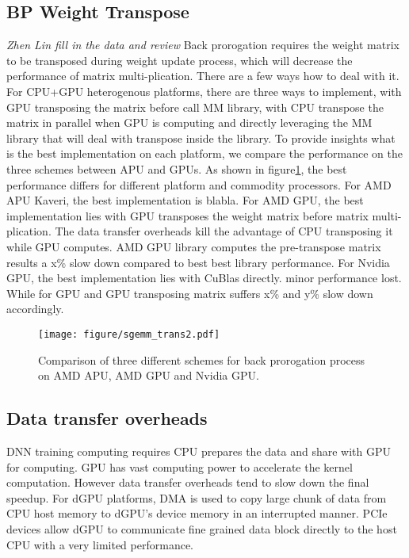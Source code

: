 \documentclass{article}
\begin{document}
\subsection{BP Weight Transpose}
\emph{Zhen Lin fill in the data and review}
Back prorogation requires the weight matrix to be transposed during weight update process, which will decrease the performance of matrix multi-plication.
There are a few ways how to deal with it. For CPU+GPU heterogenous platforms, there are three ways to implement, with GPU transposing the matrix before call MM library, with CPU transpose the matrix in parallel when GPU is computing and directly leveraging the MM library that will deal with transpose inside the library.
To provide insights what is the best implementation on each platform, we compare the performance on the three schemes between APU and GPUs.
As shown in figure\ref{fig:transpose}, the best performance differs for different platform and commodity processors.
For AMD APU Kaveri, the best implementation is blabla.
For AMD GPU, the best implementation lies with GPU transposes the weight matrix before matrix multi-plication. The data transfer overheads kill the advantage of CPU transposing it while GPU computes.
AMD GPU library computes the pre-transpose matrix results a x\% slow down compared to best best library performance.
For Nvidia GPU, the best implementation lies with CuBlas directly. minor performance lost. While for GPU and GPU transposing matrix suffers x\% and y\% slow down accordingly. 
 
\begin{figure}[h]
\centering
\texttt{[image: figure/sgemm\_trans2.pdf]}
\caption{Comparison of three different schemes for back prorogation process on AMD APU, AMD GPU and Nvidia GPU.}
\label{fig:transpose}
\end{figure}

\subsection{Data transfer overheads}
DNN training computing requires CPU prepares the data and share with GPU for computing.
GPU has vast computing power to accelerate the kernel computation. However data transfer overheads tend to slow down the final speedup.
For dGPU platforms, DMA is used to copy large chunk of data from CPU host memory to dGPU's device memory in an interrupted manner.
PCIe devices allow dGPU to communicate fine grained data block directly to the host CPU with a very limited performance.
\end{document}
